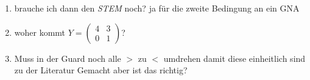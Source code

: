 \begin{enumerate}
	\item brauche ich dann den \emph{STEM} noch? \answer ja für die zweite Bedingung an ein GNA
	\item woher kommt $Y=\begin{pmatrix}
		4 & 3 \\ 0 & 1 
	\end{pmatrix}$?
	\item Muss in der Guard noch alle $>$ zu $<$ umdrehen damit diese einheitlich sind zu der Literatur \answer Gemacht aber ist das richtig?
\end{enumerate}